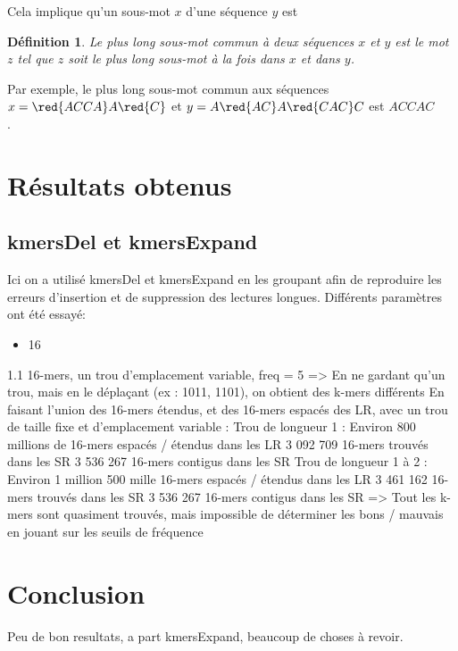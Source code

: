 \documentclass{report}
\newtheorem{defgt}{Définition}
\begin{document}
      Cela implique qu'un sous-mot $x$ d'une séquence $y$ est 
      \begin{defgt}
        Le plus long sous-mot commun à deux séquences $x$ et $y$ est le mot $z$ tel que $z$ soit le plus long sous-mot à la fois dans $x$ et dans $y$.
      \end{defgt}
      Par exemple, le plus long sous-mot commun aux séquences $x = \red{ACCA}A\red{C}$ et $y = A\red{AC}A\red{CAC}C$ est $ACCAC$\\.\\
    \newpage
  \chapter{Résultats obtenus}
    \section{kmersDel et kmersExpand}
      Ici on a utilisé kmersDel et kmersExpand en les groupant afin de reproduire les erreurs d'insertion et de suppression des lectures longues. Différents paramètres ont été essayé:
      \begin{itemize}
        \item 16
      \end{itemize}
  1.1 16-mers, un trou d’emplacement variable, freq = 5
=> En ne gardant qu’un trou, mais en le déplaçant (ex : 1011, 1101), on obtient des
k-mers différents
En faisant l’union des 16-mers étendus, et des 16-mers espacés des LR, avec un trou
de taille fixe et d’emplacement variable :
Trou de longueur 1 :
Environ 800 millions de 16-mers espacés / étendus dans les LR
3 092 709 16-mers trouvés dans les SR
3 536 267 16-mers contigus dans les SR
Trou de longueur 1 à 2 :
Environ 1 million 500 mille 16-mers espacés / étendus dans les LR
3 461 162 16-mers trouvés dans les SR
3 536 267 16-mers contigus dans les SR
=> Tout les k-mers sont quasiment trouvés, mais impossible de déterminer les bons /
mauvais en jouant sur les seuils de fréquence
  \chapter{Conclusion}
    Peu de bon resultats, a part kmersExpand, beaucoup de choses à revoir.
    \newpage
  
  
\end{document}
